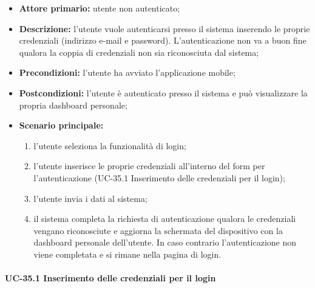 	\begin{itemize}
		\item \textbf{Attore primario:} utente non autenticato;

		\item \textbf{Descrizione:} l'utente vuole autenticarsi presso il sistema inserendo le proprie credenziali (indirizzo e-mail e password). L'autenticazione non va a buon fine qualora la coppia di credenziali non sia riconosciuta dal sistema;

		\item \textbf{Precondizioni:} l'utente ha avviato l'applicazione mobile;

		\item \textbf{Postcondizioni:} l'utente è autenticato presso il sistema e può visualizzare la propria dashboard personale;

		\item \textbf{Scenario principale:}
	  		\begin{enumerate}
		  		\item l'utente seleziona la funzionalità di login;
		  		\item l'utente inserisce le proprie credenziali all'interno del form per l'autenticazione (UC-35.1 Inserimento delle credenziali per il login);
		  		\item l'utente invia i dati al sistema;
		  		\item il sistema completa la richiesta di autenticazione qualora le credenziali vengano riconosciute e aggiorna la schermata del dispositivo con la dashboard personale dell'utente. In caso contrario l'autenticazione non viene completata e si rimane nella pagina di login.
	  		\end{enumerate}
	\end{itemize}

\paragraph{UC-35.1 Inserimento delle credenziali per il login}


